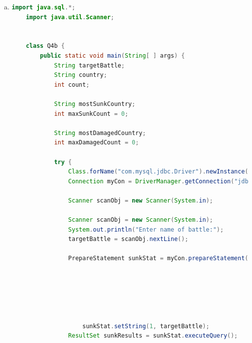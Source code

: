 \documentclass[12pt]{article}
\begin{document}
\begin{enumerate}[1.]
\begin{enumerate}[a)]
\begin{mdframed}
\begin{lstlisting}[language=JAVA]
                        while (results.next()) {
                            class = results.getString(1);
                            System.out.println(String.format("Class = %s\n", class));
                        }


                    } catch (SQLException ex) {
                        // handle the error
                        System.out.println("Error occured while establishing database connection");
                    }
                }
            }
            \end{lstlisting}

        \end{mdframed}

        \item

    \begin{lstlisting}[language=JAVA]
    import java.sql.*;
    import java.util.Scanner;


    class Q4b {
        public static void main(String[ ] args) {
            String targetBattle;
            String country;
            int count;

            String mostSunkCountry;
            int maxSunkCount = 0;

            String mostDamagedCountry;
            int maxDamagedCount = 0;

            try {
                Class.forName("com.mysql.jdbc.Driver").newInstance();
                Connection myCon = DriverManager.getConnection("jdbc:mysql://localhost/Q4"); // <- Corrected

                Scanner scanObj = new Scanner(System.in);

                Scanner scanObj = new Scanner(System.in);
                System.out.println("Enter name of battle:");
                targetBattle = scanObj.nextLine();

                PrepareStatement sunkStat = myCon.prepareStatement("SELECT country, COUNT(Outcomes.result) FROM Classes " +
                                                                    "INNER JOIN Ships ON Classes.class = Ships.class " +
                                                                    "INNER JOIN Outcomes ON Ships.name = Outcomes.ship " +
                                                                    "INNER JOIN Battles ON Battles.name = Outcome.battle " +
                                                                    "GROUP BY country " +
                                                                    "HAVING Battles.name= ? AND " +
                                                                    "Outcomes.result='sunk'");
                    sunkStat.setString(1, targetBattle);
                ResultSet sunkResults = sunkStat.executeQuery();


\end{lstlisting}
\end{enumerate}
\end{enumerate}
\end{document}
